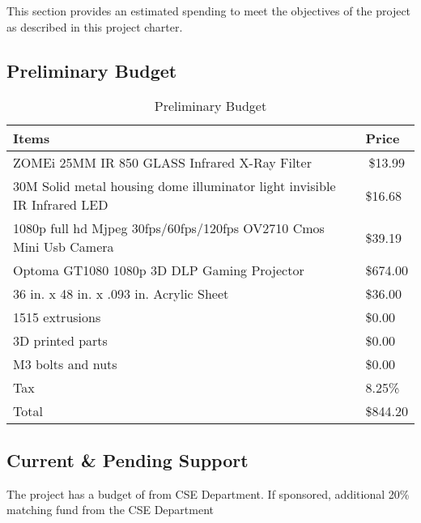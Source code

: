 This section provides an estimated spending to meet the objectives of the project as described in this project charter.
\subsection{Preliminary Budget}
\begin{table}[ht]
\centering
\caption{Preliminary Budget}
\label{my-label}
\begin{tabular}{|l|l|}
\hline
Items                                                                    & Price                        \\ \hline
ZOMEi 25MM IR 850 GLASS Infrared X-Ray Filter                            & \multicolumn{1}{c|}{\$13.99} \\ \hline
30M Solid metal housing dome illuminator light invisible IR Infrared LED & \$16.68                      \\ \hline
1080p full hd Mjpeg 30fps/60fps/120fps OV2710 Cmos Mini Usb Camera       & \$39.19                      \\ \hline
Optoma GT1080 1080p 3D DLP Gaming Projector                              & \$674.00                     \\ \hline
36 in. x 48 in. x .093 in. Acrylic Sheet                                 & \$36.00                      \\ \hline
1515 extrusions                                                          & \$0.00                       \\ \hline
3D printed parts                                                         & \$0.00                       \\ \hline
M3 bolts and nuts                                                        & \$0.00                       \\ \hline
Tax                                                                      & 8.25\%                       \\ \hline
Total                                                                    & \$844.20                     \\ \hline
\end{tabular}
\end{table}

\subsection{Current \& Pending Support}
The project has a budget of  from CSE Department. \newline
If sponsored, additional 20\% matching fund from the CSE Department
